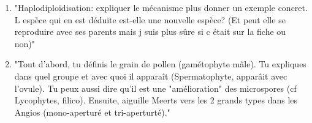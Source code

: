 \begin{enumerate}
	\item "Haplodiploïdisation: expliquer le mécanisme plus donner un exemple concret. L espèce qui en est déduite est-elle une nouvelle espèce? (Et peut elle se reproduire avec ses parents mais j suis plus sûre si c était sur la fiche ou non)"
	
	\item "Tout d'abord, tu définis le grain de pollen (gamétophyte mâle). Tu expliques dans quel groupe et avec quoi il apparaît (Spermatophyte, apparâit avec l'ovule). Tu peux aussi dire qu'il est une "amélioration" des microspores (cf Lycophytes, filico). Ensuite, aiguille Meerts vers les 2 grands types dans les Angios (mono-aperturé et tri-aperturté)."
\end{enumerate}